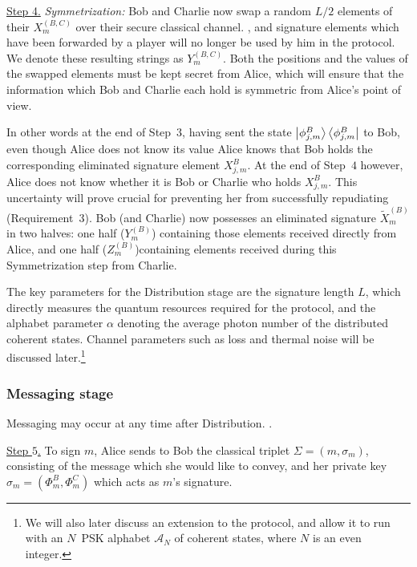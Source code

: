 \par
\noindent \underline{Step 4.} \emph{Symmetrization:} Bob and Charlie now swap a random $L/2$ elements of their $X_m^{\left(B, C\right)}$ over their secure classical channel. , and signature elements which have been forwarded by a player will no longer be used by him in the protocol. We denote these resulting strings as $Y_m^{\left(B, C\right)}$. Both the positions and the values of the swapped elements must be kept secret from Alice, which will ensure that the information which Bob and Charlie each hold is symmetric from Alice's point of view. 

In other words at the end of Step~$3$, having sent the state $\ket{\phi_{j, m}^B}\bra{\phi_{j, m}^B}$ to Bob, even though Alice does not know its value Alice knows that Bob holds the corresponding eliminated signature element $X_{j, m}^B$. At the end of Step~$4$ however, Alice does not know whether it is Bob or Charlie who holds $X_{j, m}^B$. This uncertainty will prove crucial for preventing her from successfully repudiating (Requirement~$3$). Bob (and Charlie) now possesses an eliminated signature $\tilde{X}_m^{\left(B\right)}$ in two halves: one half ($Y_m^{\left(B\right)}$) containing those elements received directly from Alice, and one half ($Z_m^{\left(B\right)}$)containing elements received during this Symmetrization step from Charlie.

The key parameters for the Distribution stage are the signature length $L$, which directly measures the quantum resources required for the protocol, and the alphabet parameter $\alpha$ denoting the average photon number of the distributed coherent states. Channel parameters such as loss and thermal noise will be discussed later.\footnote{We will also later discuss an extension to the protocol, and allow it to run with an $N$~PSK alphabet $\mathcal{A}_N$ of coherent states, where $N$ is an even integer.}

\subsubsection{Messaging stage}

Messaging may occur at any time after Distribution. .

\noindent \underline{Step $5$.} To sign $m$, Alice sends to Bob the classical triplet $\Sigma = \left(m, \sigma_m\right)$, consisting of the message which she would like to convey, and her private key $\sigma_m = \left(\Phi_m^B, \Phi_m^C\right)$ which acts as $m$'s signature. 

